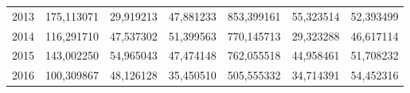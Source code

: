 \begin{table}
\begin{tabular}{p{1cm}p{2cm}p{2cm}p{2cm}p{2cm}p{2cm}p{2cm}}
 2013 & 175,113071 &    29,919213 &  47,881233 &                        853,399161 &                             55,323514 &  52,393499 \\
 2014 & 116,291710 &    47,537302 &  51,399563 &                        770,145713 &                             29,323288 &  46,617114 \\
 2015 & 143,002250 &    54,965043 &  47,474148 &                        762,055518 &                             44,958461 &  51,708232 \\
 2016 & 100,309867 &    48,126128 &  35,450510 &                        505,555332 &                             34,714391 &  54,452316 \\
\bottomrule
\end{tabular}
\end{table}
